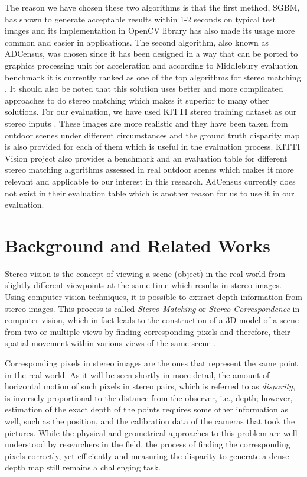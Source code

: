 \documentclass[dvips,letterpaper,12pt]{report}
\begin{document}
The reason we have chosen these two algorithms is that the first method, SGBM, has shown to generate acceptable results within 1-2 seconds on typical test images \cite{hir08} and 
its implementation in OpenCV library has also made its usage more common and easier in applications. The second algorithm, also known as ADCensus, was chosen since it has been designed in a way that
can be ported to graphics processing unit for acceleration and according to Middlebury evaluation benchmark it is currently ranked as one of the top algorithms for stereo matching \cite{mideval}.
It should also be noted that this solution uses better and more complicated approaches to do stereo matching which makes it superior to many other solutions. \newline
For our evaluation, we have used KITTI stereo training dataset as our stereo inputs \cite{kitti}. 
These images are more realistic and they have been taken from outdoor scenes under different circumstances 
and the ground truth disparity map is also provided for each of them which is useful in the evaluation process. KITTI Vision project also provides a benchmark and an evaluation table
for different stereo
matching algorithms assessed in real outdoor scenes which makes it more relevant and applicable to our interest in this research. 
AdCensus currently does not exist in their evaluation table which is another reason for us to use it in our evaluation.


\chapter{Background and Related Works}
Stereo vision is the concept of viewing a scene (object) in the real world from slightly different
viewpoints at the same time which results in stereo images. Using computer vision techniques, it is possible to extract depth information from stereo
images. This process is called {\it Stereo Matching} or {\it Stereo Correspondence} in computer vision,
which in fact leads to the construction of a
3D model of a scene from two or multiple views by finding corresponding pixels and therefore, their spatial movement within various views of the same scene \cite{sze11}.

Corresponding pixels in stereo images are the ones that represent the same point in the real
world. As it will be seen shortly in more detail, the amount of horizontal motion of such pixels
in stereo pairs, which is referred to as {\it disparity}, is inversely proportional to the
distance from the observer, i.e., depth; however,  estimation of the exact depth of the points requires some
other information as well, such as the position, and the calibration data of the cameras that took the pictures.
While the physical and geometrical approaches to this problem are well understood by researchers in the field, the process of finding the corresponding pixels correctly, yet efficiently
and measuring the disparity to generate a dense depth map still remains a challenging task. \newline
\end{document}
